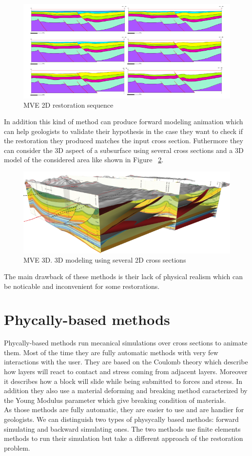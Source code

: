 \documentclass[12pt, a4paper]{report} %
\begin{document}
\begin{figure}[H]
	\centering
	\includegraphics[scale=3]{mve2D.png}
	\caption{MVE 2D restoration sequence}
	\label{mve}
\end{figure}

In addition this kind of method can produce forward modeling animation which can help geologists to validate their hypothesis in the case they want to check if the restoration they produced matches the input cross section. Futhermore they can consider the 3D aspect of a subsurface using several cross sections and a 3D model of the considered area like shown in Figure ~\ref{mve3}.

\begin{figure}[H]
	\centering
	\includegraphics[scale=1]{mve3D.png}
	\caption{MVE 3D. 3D modeling using several 2D cross sections}
	\label{mve3}
\end{figure}


The main drawback of these methods is their lack of physical realism which can be noticable and inconvenient for some restorations.
\section{Phycally-based methods}
Phycally-based methods run mecanical simulations over cross sections to animate them. Most of the time they are fully automatic methods with very few interactions with the user. They are based on the Coulomb theory which describe how layers will react to contact and stress coming from  adjacent layers. Moreover it describes how a block will slide while being submitted to forces and stress. In addition they also use a material deforming and breaking method caracterized by the Young Modulus parameter which give breaking condition of materials. \\
As those methods are fully automatic, they are easier to use and are handier for geologists.
We can distinguish two types of physycally based methods: forward simulating and backward simulating ones.
The two methods use finite elements methods to run their simulation but take a different approach of the restoration problem.
\end{document}
